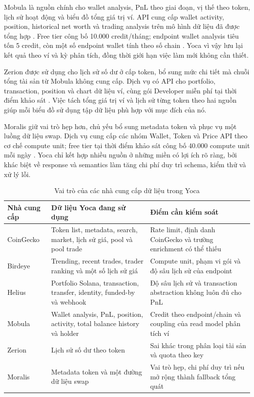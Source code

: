 Mobula là nguồn chính cho wallet analysis, PnL theo giai đoạn, vị thế theo token, lịch sử hoạt động và biểu đồ tổng giá trị ví. API cung cấp wallet activity, position, historical net worth và trading analysis trên mô hình dữ liệu đã được tổng hợp \cite{mobula-data-api}. Free tier công bố 10.000 credit/tháng; endpoint wallet analysis tiêu tốn 5 credit, còn một số endpoint wallet tính theo số chain \cite{mobula-pricing}. Yoca vì vậy lưu lại kết quả theo ví và kỳ phân tích, đồng thời giới hạn việc làm mới không cần thiết.

Zerion được sử dụng cho lịch sử số dư ở cấp token, bổ sung mức chi tiết mà chuỗi tổng tài sản từ Mobula không cung cấp. Dịch vụ có API cho portfolio, transaction, position và chart dữ liệu ví, cùng gói Developer miễn phí tại thời điểm khảo sát \cite{zerion-api}. Việc tách tổng giá trị ví và lịch sử từng token theo hai nguồn giúp mỗi biểu đồ sử dụng tập dữ liệu phù hợp với mục đích của nó.

Moralis giữ vai trò hẹp hơn, chủ yếu bổ sung metadata token và phục vụ một luồng dữ liệu swap. Dịch vụ cung cấp các nhóm Wallet, Token và Price API theo cơ chế compute unit; free tier tại thời điểm khảo sát công bố 40.000 compute unit mỗi ngày \cite{moralis-pricing}. Yoca chỉ kết hợp nhiều nguồn ở những miền có lợi ích rõ ràng, bởi khác biệt về response và semantics làm tăng chi phí duy trì schema, kiểm thử và xử lý lỗi.

\begin{table}[H]
\centering
\caption{Vai trò của các nhà cung cấp dữ liệu trong Yoca}
\label{tab:yoca_data_providers}
\renewcommand{\arraystretch}{1.2}
\scriptsize
{}
\begin{tabularx}{\textwidth}{|p{1.8cm}|P|P|}
\hline
\textbf{Nhà cung cấp} & \textbf{Dữ liệu Yoca đang sử dụng} & \textbf{Điểm cần kiểm soát} \\
\hline
CoinGecko & Token list, metadata, search, market, lịch sử giá, pool và pool trade & Rate limit, định danh CoinGecko và trường enrichment có thể thiếu \\
\hline
Birdeye & Trending, recent trades, trader ranking và một số lịch sử giá & Compute unit, phạm vi gói và độ sâu lịch sử của endpoint \\
\hline
Helius & Portfolio Solana, transaction, transfer, identity, funded-by và webhook & Độ sâu lịch sử và transaction abstraction không luôn đủ cho PnL \\
\hline
Mobula & Wallet analysis, PnL, position, activity, total balance history và holder & Credit theo endpoint/chain và coupling của read model phân tích ví \\
\hline
Zerion & Lịch sử số dư theo token & Sai khác trong phân loại tài sản và quota theo key \\
\hline
Moralis & Metadata token và một đường dữ liệu swap & Vai trò hẹp, chi phí duy trì nếu mở rộng thành fallback tổng quát \\
\hline
\end{tabularx}
\end{table}

